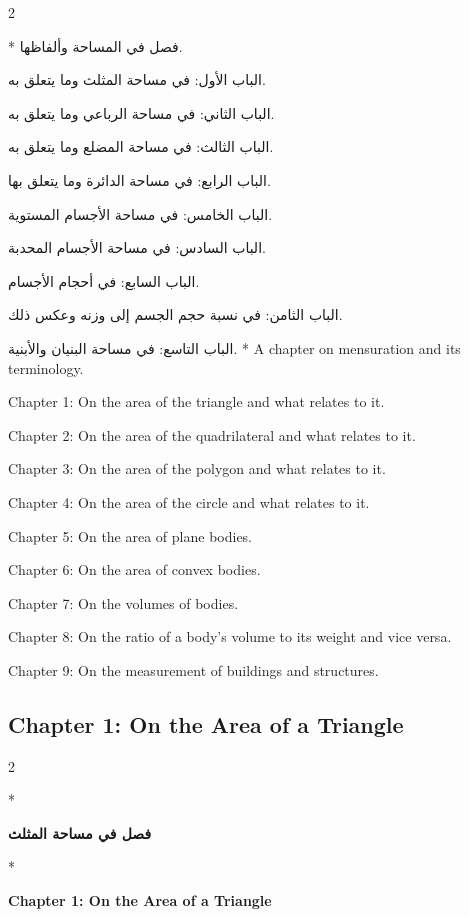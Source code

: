 \documentclass[11pt,a4paper]{article}
\newcommand{\ar}[1]{\arabicfont\beginR #1\endR}
\newenvironment{bilingual}{%
  \vspace{0.3em}%
  \begin{paracol}{2}%
}{%
  \end{paracol}%
  \vspace{0.3em}%
}
\begin{document}
\begin{bilingual}
\switchcolumn[0]*
\ar{فصل في المساحة وألفاظها.}

\ar{الباب الأول: في مساحة المثلث وما يتعلق به.}

\ar{الباب الثاني: في مساحة الرباعي وما يتعلق به.}

\ar{الباب الثالث: في مساحة المضلع وما يتعلق به.}

\ar{الباب الرابع: في مساحة الدائرة وما يتعلق بها.}

\ar{الباب الخامس: في مساحة الأجسام المستوية.}

\ar{الباب السادس: في مساحة الأجسام المحدبة.}

\ar{الباب السابع: في أحجام الأجسام.}

\ar{الباب الثامن: في نسبة حجم الجسم إلى وزنه وعكس ذلك.}

\ar{الباب التاسع: في مساحة البنيان والأبنية.}
\switchcolumn[1]*
A chapter on mensuration and its terminology.

Chapter 1: On the area of the triangle and what relates to it.

Chapter 2: On the area of the quadrilateral and what relates to it.

Chapter 3: On the area of the polygon and what relates to it.

Chapter 4: On the area of the circle and what relates to it.

Chapter 5: On the area of plane bodies.

Chapter 6: On the area of convex bodies.

Chapter 7: On the volumes of bodies.

Chapter 8: On the ratio of a body's volume to its weight and vice versa.

Chapter 9: On the measurement of buildings and structures.
\end{bilingual}

\subsection{Chapter 1: On the Area of a Triangle}

\begin{bilingual}
\switchcolumn[0]*
\begin{center}
\textbf{\color{chapcolor}\ar{فصل في مساحة المثلث}}
\end{center}
\switchcolumn[1]*
\begin{center}
\textbf{\color{chapcolor}Chapter 1: On the Area of a Triangle}
\end{center}
\end{bilingual}
\end{document}
